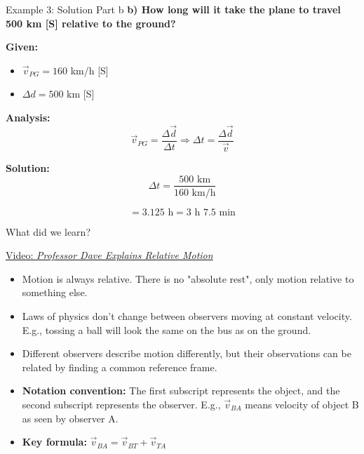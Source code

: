 \documentclass{beamer}
\begin{document}
\begin{frame}{Example 3: Solution Part b}
\textbf{b) How long will it take the plane to travel 500 km [S] relative to the ground?}



\textbf{Given:}
\begin{itemize}
\item \(\vec{v}_{PG} = 160\) km/h [S]
\item \(\Delta d = 500\) km [S]
\end{itemize}



\textbf{Analysis:}
\[\vec{v}_{PG} = \frac{\Delta \vec{d}}{\Delta t} \Rightarrow \Delta t = \frac{\Delta \vec{d}}{\vec{v}}\]



\textbf{Solution:}
\[\Delta t = \frac{500 \text{ km}}{160 \text{ km/h}}\]

\[= 3.125 \text{ h} = 3 \text{ h } 7.5 \text{ min}\]
\end{frame}

\begin{frame}{What did we learn?}

\href{https://youtu.be/wD7C4V9smG4?si=9NaAkSsVkEW4FQBZ}{Video: \textit{Professor Dave Explains Relative Motion}}


\begin{itemize}
\item Motion is always relative. There is no "absolute rest", only motion relative to something else.



\item Laws of physics don't change between observers moving at constant velocity. E.g., tossing a ball will look the same on the bus as on the ground.



\item Different observers describe motion differently, but their observations can be related by finding a common reference frame.



\item \textbf{Notation convention:} The first subscript represents the object, and the second subscript represents the observer. E.g., \(\vec{v}_{BA}\) means velocity of object B as seen by observer A.



\item \textbf{Key formula:} \(\vec{v}_{BA} = \vec{v}_{BT} + \vec{v}_{TA}\)
\end{itemize}
\end{frame}
\end{document}
